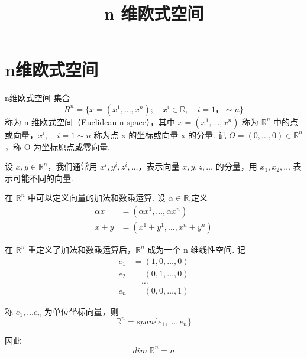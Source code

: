 \documentclass{article}
\title{n 维欧式空间}
\date{}
\author{}
\begin{document}
\maketitle

\section{n维欧式空间}
\begin{definition}{n维欧式空间}{}
    集合
    \begin{equation*}
        R^n = \{x =(x^1,\dots,x^n);\quad x^i \in \mathbb{R},\quad  i = 1， \sim n\}
    \end{equation*}
    称为 n 维欧式空间（Euclidean n-space），其中 \(x =(x^1,\dots ,x^n)\) 称为 \(\mathbb{R}^n\) 中的点或向量，\(x^i, \quad i = 1 \sim n\) 称为点 x 的坐标或向量 x 的分量. 记 \(O =(0,\dots ,0)\in \mathbb{R}^n\)，称 O 为坐标原点或零向量.
\end{definition}

\vspace{10pt}

设 \(x,y \in \mathbb{R}^n\)，我们通常用 \(x^i,y^i,z^i,\dots \)，表示向量 \(x,y,z,\dots \) 的分量，用 \(x_1,x_2,\dots \) 表示可能不同的向量.

\vspace{20pt}

在 \(\mathbb{R}^n\) 中可以定义向量的加法和数乘运算. 设 \(\alpha \in \mathbb{R}\),定义
\begin{align*}
    \alpha x &= (\alpha x^1,\dots ,\alpha x^n) \\
    x + y &= (x^1 + y^1,\dots ,x^n + y^n)
\end{align*}

在 \(\mathbb{R}^n\) 重定义了加法和数乘运算后，\(\mathbb{R}^n\) 成为一个 n 维线性空间. 记
\begin{align*}
    e_1 &= (1,0,\dots ,0) \\
    e_2 &= (0,1,\dots ,0) \\
    &\quad \dots \\
    e_n &= (0,0,\dots ,1)
\end{align*}

称 \(e_1,\dots e_n\) 为单位坐标向量，则
\begin{equation*}
    \mathbb{R}^n = span \{e_1,\dots ,e_n\}
\end{equation*}

因此
\begin{equation*}
    dim \;\mathbb{R}^n = n
\end{equation*}
\end{document}
